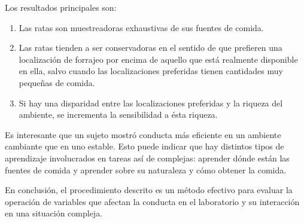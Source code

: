 \documentclass[a4paper,12pt]{article}
\begin{document}
Los resultados principales son:
\begin{enumerate}
	\item Las ratas son muestreadoras exhaustivas de sus fuentes de comida.
	\item Las ratas tienden a ser conservadoras en el sentido de que prefieren una localización de forrajeo por encima de aquello que está realmente disponible en ella, salvo cuando las localizaciones preferidas tienen cantidades muy pequeñas de comida.
	\item Si hay una disparidad entre las localizaciones preferidas y la riqueza del ambiente, se incrementa la sensibilidad a ésta riqueza.
\end{enumerate}

Es interesante que un sujeto mostró conducta más eficiente en un ambiente cambiante que en uno estable. Esto puede indicar que hay distintos tipos de aprendizaje involucrados en tareas así de complejas: aprender dónde están las fuentes de comida y aprender sobre su naturaleza y cómo obtener la comida.

En conclusión, el procedimiento descrito es un método efectivo para evaluar la operación de variables que afectan la conducta en el laboratorio y su interacción en una situación compleja.
\end{document}
